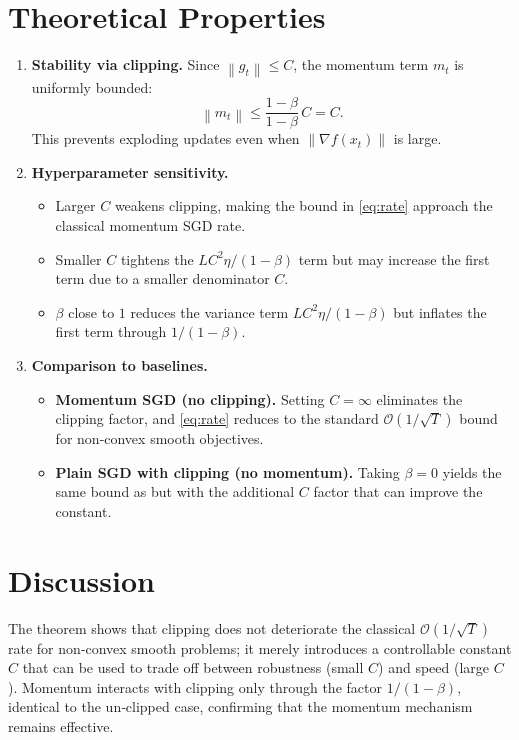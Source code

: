 \documentclass{article}
\newcommand{\norm}[1]{\left\lVert #1 \right\rVert}
\begin{document}
\section*{Theoretical Properties}
\begin{enumerate}[label=\arabic*.]
    \item \textbf{Stability via clipping.} Since $\norm{g_t}\le C$, the momentum term $m_t$ is uniformly bounded:
    \[
        \norm{m_t}\le \frac{1-\beta}{1-\beta}\,C = C .
    \]
    This prevents exploding updates even when $\norm{\nabla f(x_t)}$ is large.
    \item \textbf{Hyperparameter sensitivity.}
    \begin{itemize}
        \item Larger $C$ weakens clipping, making the bound in \eqref{eq:rate} approach the classical momentum SGD rate.
        \item Smaller $C$ tightens the $LC^2\eta/(1-\beta)$ term but may increase the first term due to a smaller denominator $C$.
        \item $\beta$ close to $1$ reduces the variance term $LC^2\eta/(1-\beta)$ but inflates the first term through $1/(1-\beta)$.
    \end{itemize}
    \item \textbf{Comparison to baselines.}
    \begin{itemize}
        \item \textbf{Momentum SGD (no clipping).} Setting $C=\infty$ eliminates the clipping factor, and \eqref{eq:rate} reduces to the standard $\mathcal{O}(1/\sqrt{T})$ bound for non‑convex smooth objectives.
        \item \textbf{Plain SGD with clipping (no momentum).} Taking $\beta=0$ yields the same bound as \cite{Ghadimi2013} but with the additional $C$ factor that can improve the constant.
    \end{itemize}
\end{enumerate}

\section*{Discussion}
The theorem shows that clipping does not deteriorate the classical $\mathcal{O}(1/\sqrt{T})$ rate for non‑convex smooth problems; it merely introduces a controllable constant $C$ that can be used to trade off between robustness (small $C$) and speed (large $C$). Momentum interacts with clipping only through the factor $1/(1-\beta)$, identical to the un‑clipped case, confirming that the momentum mechanism remains effective.
\end{document}
